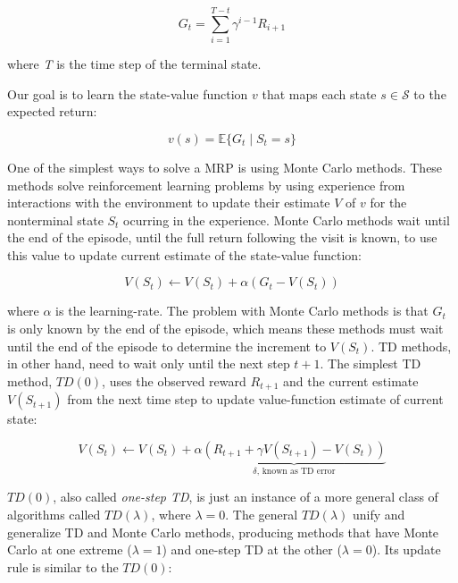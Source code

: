 \documentclass{article}
\begin{document}
\begin{equation}
    G_{t} = \sum_{i=1}^{T-t} \gamma^{i-1} R_{i+1}\label{eqn:1}
\end{equation}

where \emph{T} is the time step of the terminal state.

Our goal is to learn the state-value function $v$ that maps each state $s \in \mathcal{S}$ to the expected return:

\begin{equation}
    v(s) = \mathbb{E}\{G_{t} \mid S_{t} = s\}\label{eqn:2}
\end{equation}

One of the simplest ways to solve a MRP is using Monte Carlo methods.
These methods solve reinforcement learning problems by using experience from interactions with the environment to update their estimate $V$ of $v$ for the nonterminal state $S_{t}$ ocurring in the experience.
Monte Carlo methods wait until the end of the episode, until the full return following the visit is known, to use this value to update current estimate of the state-value function:

\begin{equation}
    V(S_{t}) \leftarrow V(S_{t}) + \alpha(G_{t} - V(S_{t}))\label{eqn:3}
\end{equation}


where $\alpha$ is the learning-rate.
The problem with Monte Carlo methods is that $G_{t}$ is only known by the end of the episode, which means these methods must wait until the end of the episode to determine the increment to $V(S_{t})$.
TD methods, in other hand, need to wait only until the next step $t + 1$.
The simplest TD method, $TD(0)$, uses the observed reward $R_{t+1}$ and the current estimate $V(S_{t+1})$ from the next time step to update value-function estimate of current state:

\begin{equation}
    V(S_{t}) \leftarrow V(S_{t}) + \alpha \underbrace{(R_{t+1} + \gamma V(S_{t+1}) - V(S_{t}))}_{\delta \text{, known as TD error}} \label{eqn:4}
\end{equation}

$TD(0)$, also called \emph{one-step TD}, is just an instance of a more general class of algorithms called $TD(\lambda)$, where $\lambda = 0$.
The general $TD(\lambda)$ unify and generalize TD and Monte Carlo methods, producing methods that have Monte Carlo at one extreme ($\lambda = 1$) and one-step TD at the other ($\lambda = 0$).
Its update rule is similar to the $TD(0)$:
\end{document}
